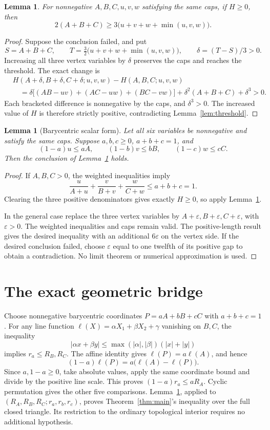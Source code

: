 \documentclass[11pt]{article}
\newtheorem{lemma}[theorem]{Lemma}
\newcommand{\abs}[1]{\lvert#1\rvert}
\begin{document}
\begin{lemma}\label{lem:cubic}
For nonnegative $A,B,C,u,v,w$ satisfying the same caps, if $H\ge0$, then
\[
 2(A+B+C)\ge3\bigl(u+v+w+\min(u,v,w)\bigr).
\]
\end{lemma}
\begin{proof}
Suppose the conclusion failed, and put
\[
 S=A+B+C,\qquad T=\tfrac32\bigl(u+v+w+\min(u,v,w)\bigr),\qquad\delta=(T-S)/3>0.
\]
Increasing all three vertex variables by $\delta$ preserves the caps and reaches the threshold. The exact change is
\begin{align*}
&H(A+\delta,B+\delta,C+\delta;u,v,w)-H(A,B,C;u,v,w)\\
&\quad=\delta\bigl[(AB-uv)+(AC-uw)+(BC-vw)\bigr]
 +\delta^2(A+B+C)+\delta^3>0.
\end{align*}
Each bracketed difference is nonnegative by the caps, and $\delta^3>0$. The increased value of $H$ is therefore strictly positive, contradicting Lemma~\ref{lem:threshold}.
\end{proof}

\begin{lemma}[Barycentric scalar form]\label{lem:weighted}
Let all six variables be nonnegative and satisfy the same caps. Suppose $a,b,c\ge0$, $a+b+c=1$, and
\[
 (1-a)u\le aA,\qquad(1-b)v\le bB,\qquad(1-c)w\le cC.
\]
Then the conclusion of Lemma~\ref{lem:cubic} holds.
\end{lemma}
\begin{proof}
If $A,B,C>0$, the weighted inequalities imply
\[
 \frac{u}{A+u}+\frac{v}{B+v}+\frac{w}{C+w}\le a+b+c=1.
\]
Clearing the three positive denominators gives exactly $H\ge0$, so apply Lemma~\ref{lem:cubic}.

In the general case replace the three vertex variables by $A+\varepsilon,B+\varepsilon,C+\varepsilon$, with $\varepsilon>0$. The weighted inequalities and caps remain valid. The positive-length result gives the desired inequality with an additional $6\varepsilon$ on the vertex side. If the desired conclusion failed, choose $\varepsilon$ equal to one twelfth of its positive gap to obtain a contradiction. No limit theorem or numerical approximation is used.
\end{proof}

\section{The exact geometric bridge}
Choose nonnegative barycentric coordinates $P=aA+bB+cC$ with $a+b+c=1$. For any line function $\ell(X)=\alpha X_1+\beta X_2+\gamma$ vanishing on $B,C$, the inequality
\[
 \abs{\alpha x+\beta y}\le\max(\abs\alpha,\abs\beta)(\abs x+\abs y)
\]
implies $r_a\le R_B,R_C$. The affine identity gives $\ell(P)=a\ell(A)$, and hence
\[
 (1-a)\ell(P)=a\bigl(\ell(A)-\ell(P)\bigr).
\]
Since $a,1-a\ge0$, take absolute values, apply the same coordinate bound and divide by the positive line scale. This proves $(1-a)r_a\le aR_A$. Cyclic permutation gives the other five comparisons. Lemma~\ref{lem:weighted}, applied to $(R_A,R_B,R_C;r_a,r_b,r_c)$, proves Theorem~\ref{thm:main}'s inequality over the full closed triangle. Its restriction to the ordinary topological interior requires no additional hypothesis.
\end{document}
